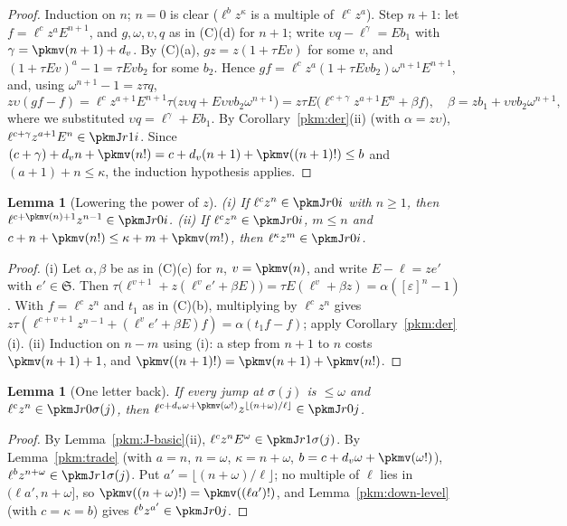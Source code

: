 \documentclass[10pt]{amsart}
\newtheorem{lemma}[theorem]{Lemma}
\theoremstyle{definition}
\theoremstyle{remark}
\begin{document}
\begin{proof}
Induction on $n$; $n=0$ is clear ($\ell^bz^\kappa$ is a multiple of $\ell^cz^a$). Step $n+1$: let
$f=\ell^cz^aE^{n+1}$, and $g,\omega,\upsilon,q$ as in (C)(d) for $n+1$; write $\upsilon
q-\ell^{\gamma}=Eb_1$ with $\gamma=\pkmv(n+1)+d_v$. By (C)(a), $gz=z(1+\tau Ev)$ for some $v$, and
$(1+\tau Ev)^a-1=\tau Evb_2$ for some $b_2$. Hence $gf=\ell^cz^a(1+\tau Evb_2)\omega^{n+1}E^{n+1}$, and,
using $\omega^{n+1}-1=z\tau q$,
\[
z\upsilon(gf-f)=\ell^cz^{a+1}E^{n+1}\tau\bigl(z\upsilon q+E\upsilon vb_2\omega^{n+1}\bigr)
=z\tau E\bigl(\ell^{c+\gamma}z^{a+1}E^n+\beta f\bigr),\quad \beta=zb_1+\upsilon vb_2\omega^{n+1},
\]
where we substituted $\upsilon q=\ell^\gamma+Eb_1$. By Corollary~\ref{pkm:der}(ii) (with $\alpha=z\upsilon$),
$\ell^{c+\gamma}z^{a+1}E^n\in\pkmJ r1i$. Since $(c+\gamma)+d_vn+\pkmv(n!)=c+d_v(n+1)+\pkmv((n+1)!)\le b$
and $(a+1)+n\le\kappa$, the induction hypothesis applies.
\end{proof}

\begin{lemma}[Lowering the power of $z$]\label{pkm:lower}
(i) If $\ell^cz^{n}\in\pkmJ r0i$ with $n\ge1$, then $\ell^{c+\pkmv(n)+1}z^{n-1}\in\pkmJ r0i$.
(ii) If $\ell^cz^n\in\pkmJ r0i$, $m\le n$ and $c+n+\pkmv(n!)\le\kappa+m+\pkmv(m!)$, then $\ell^\kappa
z^m\in\pkmJ r0i$.
\end{lemma}

\begin{proof}
(i) Let $\alpha,\beta$ be as in (C)(c) for $n$, $v=\pkmv(n)$, and write $E-\ell=ze'$ with $e'\in\mathfrak S$.
Then $\tau\bigl(\ell^{v+1}+z(\ell^ve'+\beta E)\bigr)=\tau E(\ell^v+\beta z)=\alpha([\varepsilon]^n-1)$.
With $f=\ell^cz^n$ and $t_1$ as in (C)(b), multiplying by $\ell^cz^n$ gives $z\tau(\ell^{c+v+1}z^{n-1}+
(\ell^ve'+\beta E)f)=\alpha(t_1f-f)$; apply Corollary~\ref{pkm:der}(i).
(ii) Induction on $n-m$ using (i): a step from $n+1$ to $n$ costs $\pkmv(n+1)+1$, and
$\pkmv((n+1)!)=\pkmv(n+1)+\pkmv(n!)$.
\end{proof}

\begin{lemma}[One letter back]\label{pkm:div}
If every jump at $\sigma(j)$ is $\le\omega$ and $\ell^cz^n\in\pkmJ r0{\sigma(j)}$, then
$\ell^{c+d_v\omega+\pkmv(\omega!)}z^{\lfloor(n+\omega)/\ell\rfloor}\in\pkmJ r0j$.
\end{lemma}

\begin{proof}
By Lemma~\ref{pkm:J-basic}(ii), $\ell^cz^nE^\omega\in\pkmJ r1{\sigma(j)}$. By Lemma~\ref{pkm:trade} (with
$a=n$, $n=\omega$, $\kappa=n+\omega$, $b=c+d_v\omega+\pkmv(\omega!)$), $\ell^bz^{n+\omega}\in\pkmJ
r1{\sigma(j)}$. Put $a'=\lfloor(n+\omega)/\ell\rfloor$; no multiple of $\ell$ lies in $(\ell a',n+\omega]$,
so $\pkmv((n+\omega)!)=\pkmv((\ell a')!)$, and Lemma~\ref{pkm:down-level} (with $c=\kappa=b$) gives
$\ell^bz^{a'}\in\pkmJ r0j$.
\end{proof}
\end{document}
